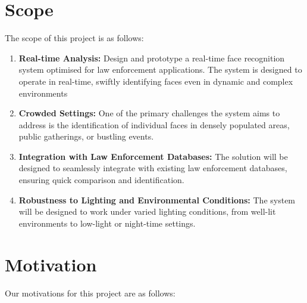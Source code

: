 \section{Scope}
	The scope of this project is as follows:

	\begin{enumerate}
		\item \textbf{Real-time Analysis:} Design and prototype a real-time face recognition system optimised for law enforcement applications. The system is designed to operate in real-time, swiftly identifying faces even in dynamic and complex environments
		
		\item \textbf{Crowded Settings:} One of the primary challenges the system aims to address is the identification of individual faces in densely populated areas, public gatherings, or bustling events.
		
		\item \textbf{Integration with Law Enforcement Databases:} The solution will be designed to seamlessly integrate with existing law enforcement databases, ensuring quick comparison and identification.
		
		\item \textbf{Robustness to Lighting and Environmental Conditions:} The system will be designed to work under varied lighting conditions, from well-lit environments to low-light or night-time settings.
	\end{enumerate}

\section{Motivation}
	Our motivations for this project are as follows:

